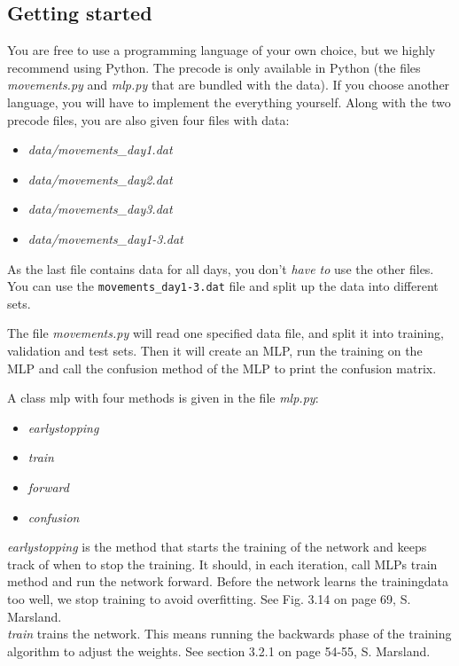 \documentclass{article}           %
\begin{document}
\subsection*{Getting started}

You are free to use a programming language of your own choice, but we highly recommend using Python. The precode is only available in Python (the files \emph{movements.py} and \emph{mlp.py} that are bundled with the data). If you choose another language, you will have to implement the everything yourself. Along with the two precode files, you are also given four files with data:
\begin{itemize}
\item \emph{data/movements\_day1.dat}
\item \emph{data/movements\_day2.dat}
\item \emph{data/movements\_day3.dat}
\item \emph{data/movements\_day1-3.dat}
\end{itemize}
As the last file contains data for all days, you don't \emph{have to} use the other files.
You can use the \texttt{movements\_day1-3.dat} file and split up the data into different sets.


The file \emph{movements.py} will read one specified data file, and split it into training, validation and test sets. Then it will create an MLP, run the training on the MLP and call the confusion method of the MLP to print the confusion matrix.

\noindent A class mlp with four methods is given in the file \emph{mlp.py}:

\begin{itemize}
\item \emph{earlystopping}
\item \emph{train}
\item \emph{forward}
\item \emph{confusion}
\end{itemize}

\noindent \emph{earlystopping} is the method that starts the training of the network and keeps track of when to stop the training. It should, in each iteration, call MLPs train method and run the network forward. Before the network learns the trainingdata too well, we stop training to avoid overfitting. See Fig. 3.14 on page 69, S. Marsland.\\

\noindent \emph{train} trains the network. This means running the backwards phase of the training algorithm to adjust the weights. See section 3.2.1 on page 54-55, S. Marsland.\\
\end{document}
